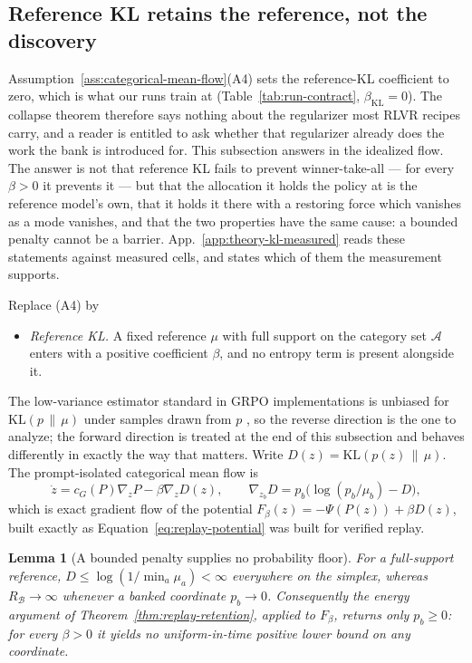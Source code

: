 \documentclass{article}
\newcommand{\1}{\mathbf 1}
\newtheorem{lemma}{Lemma}[section]
\theoremstyle{remark}
\theoremstyle{definition}
\theoremstyle{plain}
\begin{document}
\subsection{Reference KL retains the reference, not the discovery}
\label{app:theory-kl}

Assumption~\ref{ass:categorical-mean-flow}(A4) sets the reference-KL
coefficient to zero, which is what our runs train at
(Table~\ref{tab:run-contract}, $\beta_{\mathrm{KL}}=0$). The collapse theorem
therefore says nothing about the regularizer most RLVR recipes carry, and a
reader is entitled to ask whether that regularizer already does the work the
bank is introduced for. This subsection answers in the idealized flow. The
answer is not that reference KL fails to prevent winner-take-all --- for every
$\beta>0$ it prevents it --- but that the allocation it holds the policy at is
the reference model's own, that it holds it there with a restoring force which
vanishes as a mode vanishes, and that the two properties have the same cause:
a bounded penalty cannot be a barrier. App.~\ref{app:theory-kl-measured} reads
these statements against measured cells, and states which of them the
measurement supports.

Replace (A4) by
\begin{itemize}
\item[(A4$'$)] \emph{Reference KL.} A fixed reference $\mu$ with full support
  on the category set $\mathcal A$ enters with a positive coefficient $\beta$,
  and no entropy term is present alongside it.
\end{itemize}
The low-variance estimator standard in GRPO implementations is unbiased for
$\mathrm{KL}(p\,\|\,\mu)$ under samples drawn from $p$
\citep{shao2024deepseekmath}, so the reverse direction is the one to analyze;
the forward direction is treated at the end of this subsection and behaves
differently in exactly the way that matters. Write
$D(z)=\mathrm{KL}(p(z)\,\|\,\mu)$. The prompt-isolated categorical mean flow is
\begin{equation}
  \dot z=c_G(P)\nabla_zP-\beta\nabla_zD(z),
  \qquad
  \nabla_{z_b}D=p_b\big(\log(p_b/\mu_b)-D\big),
  \label{eq:kl-mean-flow}
\end{equation}
which is exact gradient flow of the potential
$F_\beta(z)=-\Psi(P(z))+\beta D(z)$, built exactly as
Equation~\eqref{eq:replay-potential} was built for verified replay.

\begin{lemma}[A bounded penalty supplies no probability floor]
\label{lem:kl-no-barrier}
For a full-support reference, $D\le\log(1/\min_a\mu_a)<\infty$ everywhere on
the simplex, whereas $R_{\mathcal B}\to\infty$ whenever a banked coordinate
$p_b\to0$. Consequently the energy argument of
Theorem~\ref{thm:replay-retention}, applied to $F_\beta$, returns only
$p_b\ge0$: for every $\beta>0$ it yields no uniform-in-time positive lower
bound on any coordinate.
\end{lemma}
\end{document}
